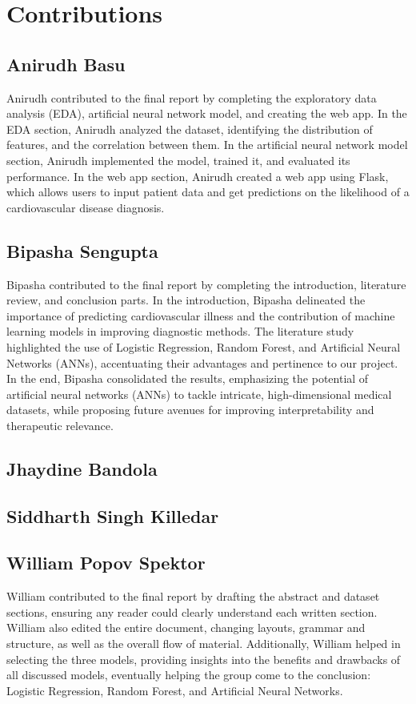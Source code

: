 \section{Contributions}

\subsection{Anirudh Basu}

Anirudh contributed to the final report by completing the exploratory data analysis (EDA), artificial neural network model, and creating the web app. In the EDA section, Anirudh analyzed the dataset, identifying the distribution of features, and the correlation between them. In the artificial neural network model section, Anirudh implemented the model, trained it, and evaluated its performance. In the web app section, Anirudh created a web app using Flask, which allows users to input patient data and get predictions on the likelihood of a cardiovascular disease diagnosis.

\subsection{Bipasha Sengupta}
Bipasha contributed to the final report by completing the introduction, literature review, and conclusion parts. In the introduction, Bipasha delineated the importance of predicting cardiovascular illness and the contribution of machine learning models in improving diagnostic methods. The literature study highlighted the use of Logistic Regression, Random Forest, and Artificial Neural Networks (ANNs), accentuating their advantages and pertinence to our project. In the end, Bipasha consolidated the results, emphasizing the potential of artificial neural networks (ANNs) to tackle intricate, high-dimensional medical datasets, while proposing future avenues for improving interpretability and therapeutic relevance.

\subsection{Jhaydine Bandola}

\subsection{Siddharth Singh Killedar}

\subsection{William Popov Spektor}
William contributed to the final report by drafting the abstract and dataset sections, ensuring any reader could clearly understand each written section. William also edited the entire document, changing layouts, grammar and structure, as well as the overall flow of material. Additionally, William helped in selecting the three models, providing insights into the benefits and drawbacks of all discussed models, eventually helping the group come to the conclusion: Logistic Regression, Random Forest, and Artificial Neural Networks.


